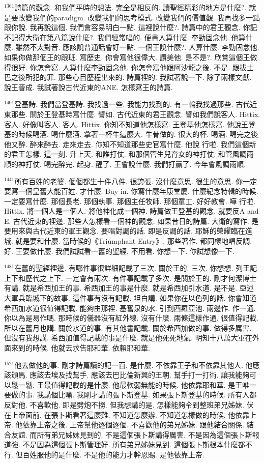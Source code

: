 \documentclass{book}
\begin{document}
$^{1361}$詩篇的觀念.
和我們平時的想法.
完全是相反的.
讀聖經精彩的地方是什麼?.
就是要改變我們的paradigm.
改變我們的思考模式.
改變我們的價值觀.
我再找多一點跟你說.
我再說這個.
我們會容易明白一點.
這裡說什麼?.
詩篇中的君王觀念.
你記不記得大衛在第八篇說什麼?.
我們經常唱的.
便書人算什麼.
李勁固念他.
他算什麼.
雖然不太對音.
應該說普通話會好一點.
一個王說什麼?.
人算什麼.
李勁固念他.
如果你做那個王的跟班.
寫歷史.
你會寫他很偉大.
讚美他.
是不是?.
欣賞這個王做得很好.
你怎會寫.
人算什麼李勁固念他.
你怎會寫他跟阿沙龍之後.
不是.
跟拔士巴之後所犯的罪.
那些心目歷程出來的.
詩篇裡的.
我試著說一下.
除了兩樣文獻.
說王晉成.
我試著說古代近東的ANE.
怎樣寫王的詩篇.

$^{1401}$登基詩.
我們當登基詩.
我找過一些.
我能力找到的.
有一輪我找過那些.
古代近東那些.
關於王登基時寫什麼.
譬如.
古代近東的君王觀念.
譬如我們說客人.
Hittix.
客人.
好像叫客人.
客人.
Hittix.
你知不知道他怎樣寫.
王登基他怎樣寫.
他說王登基的時候喝酒.
喝什麼酒.
拿著一杯牛這麼大.
牛骨做的.
很大的杯.
喝酒.
喝完之後他又醉.
醉來醉去.
走來走去.
你知不知道那些史官寫什麼.
他說 行啦.
我們這個新的君王怎樣.
這一刻.
升上天.
和誰打仗.
和那個管生兒育女的神打仗.
和管風調雨順的神打仗.
喝完醉完.
起身.
醒了.
王會說什麼.
我們打贏了.
今年會風調雨順.

$^{1441}$所有百姓的老婆.
個個都生十件八件.
很誇張.
沒什麼意思.
很生的意思.
你一定要寫一個皇舊大能百姓.
才什麼.
Buy in.
你寫什麼年康堂慶.
什麼紀念特輯的時候.
一定要寫什麼.
那個長老.
那個執事.
那個主任牧師.
那個童工.
好好教會.
嘩 行啦.
Hittix.
將一個人是一個人.
將他神化成一個神.
詩篇做王登基的觀念.
就要反A and E.
古代近東的裡邊.
那些人怎樣看一個神的觀念.
如果昔日的詩篇.
大衛的寫作.
是要用來與古代近東的軍王觀念.
要唱對調的話.
即是反調的話.
耶穌的榮耀臨在進城.
就是要和什麼.
當時候的《Triumphant Entry》.
那些著作.
都同樣地唱反調.
好.
王要做什麼.
我們試試看一舊的聖經.
不用看.
你想一下.
你試想像一下.

$^{1481}$在舊的聖經裡邊.
有哪件事很詳細記載了三次.
關於王的.
三次.
你想想.
列王記上下和歷代之上下.
一定會有兩次.
有件事記載了多次.
是關於王的.
剛才何潔博士有講.
就是希西加王的事.
希西加王的事是什麼.
就是希西加引水道.
是不是.
亞述大軍兵臨城下的故事.
這件事有沒有記載.
坦白講.
如果你在以色列的話.
你會知道希西加水道很值得記載.
能夠由那裡.
基奮泉的水.
引到西羅亞池.
兩邊作.
作一通.
你以為是易作嗎.
那時候的儀器沒有紅外線.
沒有什麼.
兩條這樣作通.
很值得記載.
所以在舊月也講.
關於水道的事.
有其他書記載.
關於希西加做的事.
做得多厲害.
但沒有我想講.
希西加值得記載的事是什麼.
就是他死死地氣.
明知十八萬大軍在外面來到的時候.
他就去求告耶和華.
依賴耶和華.

$^{1521}$他去做他的事.
剛才詩篇讀的記一百.
是什麼.
不依靠王子和不依靠其他人.
他應該頒馬.
應該去埃及找幫手.
應該去巴比倫新興的王朝.
幫手打一打術.
讓我能夠可以鬆一鬆.
王最值得記載的是什麼.
他最軟弱無能的時候.
他依靠耶和華.
是王唯一要做的事.
我講個比喻.
我剛才講的張卜斯登基.
如果張卜斯登基的時候.
所有人都反對他.
不喜歡他.
即是劈炮不撈.
但我想講的是.
怎樣能夠令到整班弟兄姊妹.
伏在上帝面前.
在張卜斯看著這麼難.
不知道怎麼辦.
不知道怎樣做的時候.
他依靠上帝.
他依靠上帝之後.
上帝幫他逐個逐個.
不喜歡他的弟兄姊妹.
跟他結合關係.
結合友誼.
而所有弟兄姊妹見到的.
不是這個張卜斯講得厲害.
不是因為這個張卜斯報道強.
不是因為這個張卜斯管理好.
所有弟兄姊妹見到.
這個張卜斯根本什麼都不行.
但百姓服他的是什麼.
不是他的能力才幹恩賜.
是他依靠上帝.
\end{document}
